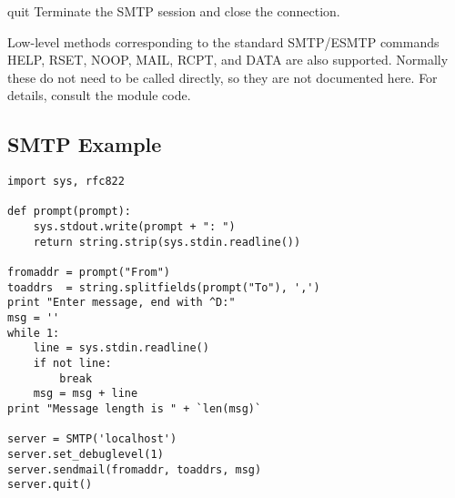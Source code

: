 \begin{methoddesc}{quit}{}
Terminate the SMTP session and close the connection.
\end{methoddesc}

Low-level methods corresponding to the standard SMTP/ESMTP commands
HELP, RSET, NOOP, MAIL, RCPT, and DATA are also supported.  Normally
these do not need to be called directly, so they are not documented
here. For details, consult the module code.


\subsection{SMTP Example}
\label{SMTP-example}


\begin{verbatim}
import sys, rfc822

def prompt(prompt):
    sys.stdout.write(prompt + ": ")
    return string.strip(sys.stdin.readline())

fromaddr = prompt("From")
toaddrs  = string.splitfields(prompt("To"), ',')
print "Enter message, end with ^D:"
msg = ''
while 1:
    line = sys.stdin.readline()
    if not line:
        break
    msg = msg + line
print "Message length is " + `len(msg)`

server = SMTP('localhost')
server.set_debuglevel(1)
server.sendmail(fromaddr, toaddrs, msg)
server.quit()
\end{verbatim}


\begin{seealso}

\end{seealso}
